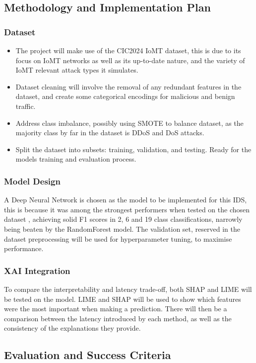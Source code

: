 \documentclass[11pt,a4paper]{article}
\begin{document}
\subsection{Methodology and Implementation Plan}
\subsubsection{Dataset}
\begin{itemize}
    \item The project will make use of the CIC2024 IoMT dataset, this is due to its focus on IoMT networks as well as its up-to-date nature, and the variety of IoMT relevant attack types it simulates.
    \item Dataset cleaning will involve the removal of any redundant features in the dataset, and create some categorical encodings for malicious and benign traffic.
    \item Address class imbalance, possibly using SMOTE to balance dataset, as the majority class by far in the dataset is DDoS and DoS attacks.
    \item Split the dataset into subsets: training, validation, and testing. Ready for the models training and evaluation process.
\end{itemize}

\subsubsection{Model Design}
A Deep Neural Network is chosen as the model to be implemented for this IDS, this is because it was among the strongest performers when tested on the chosen dataset \cite{dadkhah2024ciciomt2024}, achieving solid F1 scores in 2, 6 and 19 class classifications, narrowly being beaten by the RandomForest model. The validation set, reserved in the dataset preprocessing will be used for hyperparameter tuning, to maximise performance.

\subsubsection{XAI Integration}
To compare the interpretability and latency trade-off, both SHAP and LIME will be tested on the model. LIME and SHAP will be used to show which features were the most important when making a prediction. There will then be a comparison between the latency introduced by each method, as well as the consistency of the explanations they provide.

\subsection{Evaluation and Success Criteria}
\end{document}
